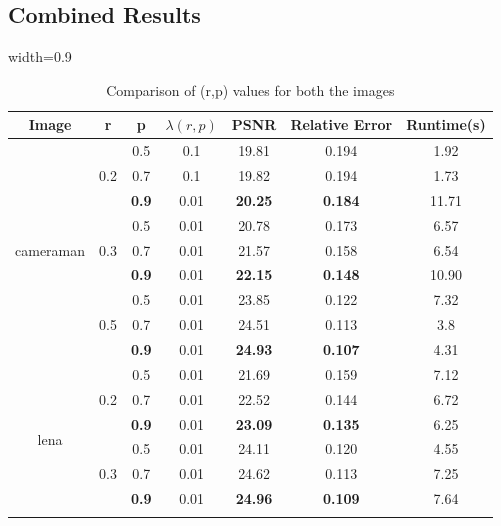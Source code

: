 \documentclass[12pt,a4paper,onecolumn]{exam}
\begin{document}
\subsection{Combined Results}

\begin{table}[H]
\centering
\caption{Comparison of (r,p) values for both the images}
\label{table:resultstable}
\renewcommand{\arraystretch}{1.1}

\begin{adjustbox}{width=0.9\textwidth}
\begin{tabular}{|c|c|c|c|c|c|c|}
\hline
Image & r & p & $\lambda(r,p)$ & PSNR & Relative Error & Runtime(s)\\
\hline

\multirow{9}{*}{cameraman}


& \multirow{3}{*}{0.2} & 0.5 & 0.1 & 19.81 & 0.194 & 1.92\\ 
&                      & 0.7 & 0.1 & 19.82 & 0.194 & 1.73\\ 
&                      & \textbf{0.9} & 0.01 & \textbf{20.25} & \textbf{0.184} & 11.71 \\ \cline{2-7}


& \multirow{3}{*}{0.3} & 0.5 & 0.01 & 20.78 & 0.173 & 6.57\\ 
&                      & 0.7 & 0.01 & 21.57 & 0.158 & 6.54\\ 
&                      & \textbf{0.9} & 0.01 & \textbf{22.15} & \textbf{0.148} & 10.90\\ \cline{2-7}


& \multirow{3}{*}{0.5} & 0.5 & 0.01 & 23.85 & 0.122 & 7.32\\ 
&                      & 0.7 & 0.01 & 24.51 & 0.113 & 3.8\\ 
&                      & \textbf{0.9} & 0.01 & \textbf{24.93} & \textbf{0.107} & 4.31\\

\hline


\multirow{9}{*}{lena}

& \multirow{3}{*}{0.2} & 0.5 & 0.01 & 21.69 & 0.159 & 7.12\\ 
&                      & 0.7 & 0.01 & 22.52 & 0.144 & 6.72\\ 
&                      & \textbf{0.9} & 0.01 & \textbf{23.09} & \textbf{0.135} & 6.25\\ \cline{2-7}


& \multirow{3}{*}{0.3} & 0.5 & 0.01 & 24.11 & 0.120 & 4.55\\ 
&                      & 0.7 & 0.01 & 24.62 & 0.113 & 7.25\\ 
&                      & \textbf{0.9} & 0.01 & \textbf{24.96} & \textbf{0.109} & 7.64\\ \cline{2-7}



\end{tabular}
\end{adjustbox}
\end{table}
\end{document}
